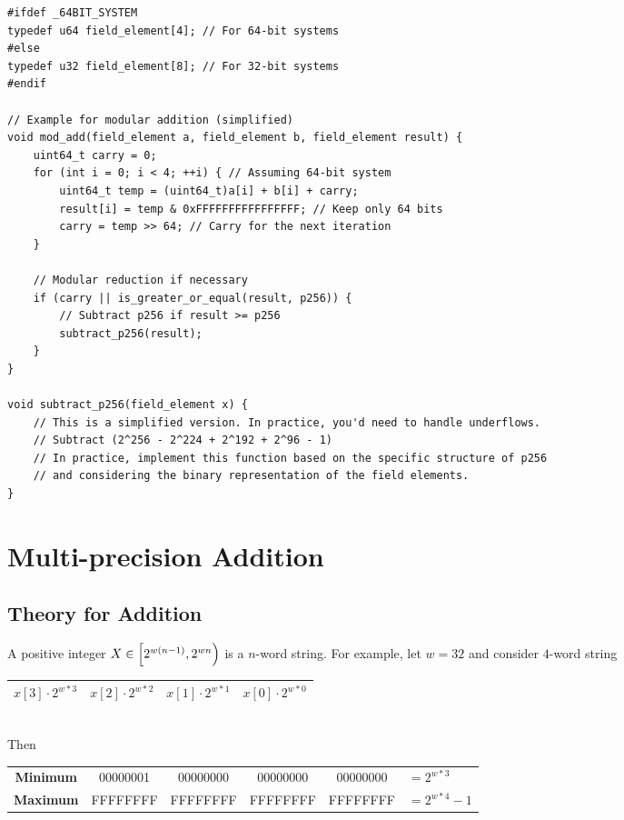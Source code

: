 \vspace{4pt}
\begin{lstlisting}[style=C]
#ifdef _64BIT_SYSTEM
typedef u64 field_element[4]; // For 64-bit systems
#else
typedef u32 field_element[8]; // For 32-bit systems
#endif

// Example for modular addition (simplified)
void mod_add(field_element a, field_element b, field_element result) {
	uint64_t carry = 0;
	for (int i = 0; i < 4; ++i) { // Assuming 64-bit system
		uint64_t temp = (uint64_t)a[i] + b[i] + carry;
		result[i] = temp & 0xFFFFFFFFFFFFFFFF; // Keep only 64 bits
		carry = temp >> 64; // Carry for the next iteration
	}
	
	// Modular reduction if necessary
	if (carry || is_greater_or_equal(result, p256)) {
		// Subtract p256 if result >= p256
		subtract_p256(result);
	}
}

void subtract_p256(field_element x) {
	// This is a simplified version. In practice, you'd need to handle underflows.
	// Subtract (2^256 - 2^224 + 2^192 + 2^96 - 1)
	// In practice, implement this function based on the specific structure of p256
	// and considering the binary representation of the field elements.
}
\end{lstlisting}

\newpage
\section{Multi-precision Addition}

\subsection{Theory for Addition}

\begin{note}
A positive integer $X\in\intco{2^{w(n-1)}, 2^{wn}}$ is a $n$-word string. For example, let $w=32$ and consider $4$-word string
\begin{table}[h!]\centering\renewcommand{\arraystretch}{1.25}
\begin{tabular}{|c|c|c|c|}
\hline
$x[3]\cdot 2^{w*3}$ & $x[2]\cdot 2^{w*2}$ & $x[1]\cdot 2^{w*1}$ & $x[0]\cdot 2^{w*0}$\\
\hline
\end{tabular}
\end{table}\\
Then
\begin{table}[h!]\centering\renewcommand{\arraystretch}{1.25}
{\ttfamily\begin{tabular}{c|c|c|c|c|l}
\cline{2-5}
\textnormal{\bf Minimum} & 00000001 & 00000000 & 00000000 & 00000000 & $=2^{w*3}$\\ \cline{2-5}
\textnormal{\bf Maximum} & FFFFFFFF & FFFFFFFF & FFFFFFFF & FFFFFFFF & $=2^{w*4}-1$\\ \cline{2-5}
\end{tabular}}
\end{table}
\end{note}

